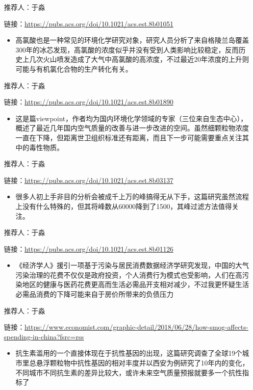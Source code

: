 \documentclass[]{book}
\providecommand{\tightlist}{%
  \setlength{\itemsep}{0pt}\setlength{\parskip}{0pt}}
\begin{document}
推荐人：于淼

链接：\url{https://pubs.acs.org/doi/10.1021/acs.est.8b01051}

\begin{itemize}
\tightlist
\item
  高氯酸也是一种常见的环境化学研究对象，研究人员分析了来自格陵兰岛覆盖300年的冰芯发现，高氯酸的浓度似乎并没有受到人类影响比较稳定，反而历史上几次火山喷发造成了大气中高氯酸的高浓度，不过最近20年浓度的上升则可能与有机氯化合物的生产转化有关。
\end{itemize}

推荐人：于淼

链接：\url{https://pubs.acs.org/doi/10.1021/acs.est.8b01890}

\begin{itemize}
\tightlist
\item
  这是篇viewpoint，作者均为国内环境化学领域的专家（三位来自生态中心），概述了最近几年国内空气质量的改善与进一步改进的空间。虽然细颗粒物浓度一直在下降，但距离世卫组织标准还有距离，而且下一步可能需要重点关注其中的毒性物质。
\end{itemize}

推荐人：于淼

链接：\url{https://pubs.acs.org/doi/10.1021/acs.est.8b03137}

\begin{itemize}
\tightlist
\item
  很多人初上手非目的分析会被成千上万的峰搞得无从下手，这篇研究虽然流程上没有什么特殊的，但其将峰数从60000降到了1500，其峰过滤方法值得关注。
\end{itemize}

推荐人：于淼

链接：\url{https://pubs.acs.org/doi/10.1021/acs.est.8b01126}

\begin{itemize}
\tightlist
\item
  《经济学人》援引一项基于污染与居民消费数据经济学研究发现，中国的大气污染治理的花费不仅仅是政府投资，个人消费行为模式也受影响，人们在高污染地区的健康与医药花费更高而生活必需品开支相对减少，不过我更怀疑生活必需品消费的下降可能来自于房价所带来的负债压力
\end{itemize}

推荐人：于淼

链接：\url{https://www.economist.com/graphic-detail/2018/06/28/how-smog-affects-spending-in-china?fsrc=rss}

\begin{itemize}
\tightlist
\item
  抗生素滥用的一个直接体现在于抗性基因的出现，这篇研究调查了全球19个城市里总悬浮颗粒物中抗性基因的相对丰度并以西安为例研究了10年内的变化，不同城市不同抗生素的差异比较大，或许未来空气质量预报就要多一个抗性指标了
\end{itemize}
\end{document}
